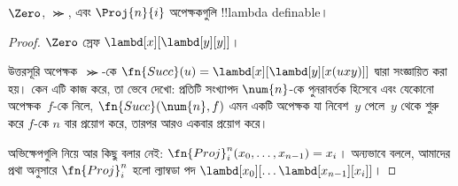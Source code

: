 \documentclass[../../../include/open-logic-section]{subfiles}
\begin{document}

\begin{lem}
$\Zero$, $\Succ$, এবং $\Proj{n}{i}$ অপেক্ষকগুলি !!{lambda definable}।
\end{lem}

\begin{proof}
$\Zero$ স্রেফ
$\lambd[x][\lambd[y][y]]$।

উত্তরসূরি অপেক্ষক~$\Succ$-কে
$\fn{Succ}(u) = \lambd[x][\lambd[y][x(uxy)]]$ দ্বারা সংজ্ঞায়িত করা হয়।
কেন এটি কাজ করে, তা ভেবে দেখো: প্রতিটি সংখ্যাপদ $\num{n}$-কে পুনরাবর্তক
হিসেবে এবং যেকোনো অপেক্ষক~$f$-কে নিলে, $\fn{Succ}(\num{n},f)$ এমন একটি
অপেক্ষক যা নিবেশ~$y$ পেলে~$y$ থেকে শুরু করে $f$-কে $n$ বার প্রয়োগ করে,
তারপর আরও একবার প্রয়োগ করে।

অভিক্ষেপগুলি নিয়ে আর কিছু বলার নেই: $\fn{Proj}^n_i(x_0, \dots,
x_{n-1}) = x_i$। অন্যভাবে বললে, আমাদের প্রথা অনুসারে $\fn{Proj}^n_i$
হলো ল্যাম্বডা পদ $\lambd[x_0][\dots \lambd[x_{n-1}][x_i]]$।
\end{proof}
\end{document}
